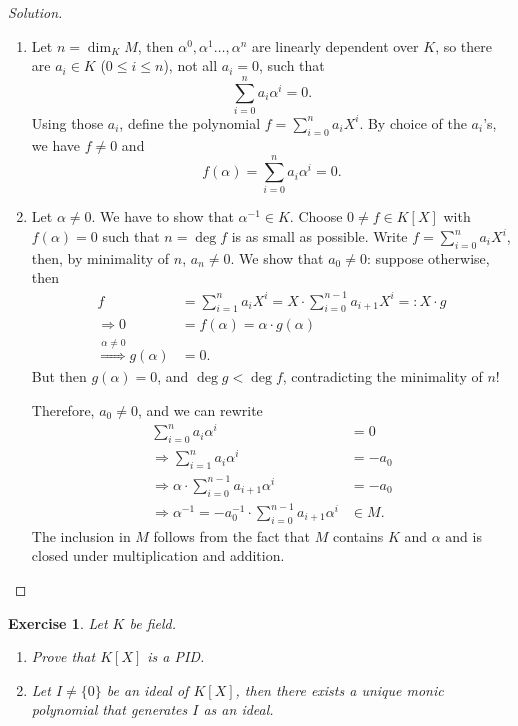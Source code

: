 \documentclass[a4paper,10pt,reqno]{amsart}
\newtheorem{ex}{Exercise}[section]
\newenvironment{sol}
  {\renewcommand\qedsymbol{$\blacksquare$}\begin{proof}[Solution]}
  {\end{proof}}
\begin{document}
\begin{sol}
    \begin{enumerate}[label=(\roman*)]
        \item Let $n = \dim_KM$, then $\alpha^0,\alpha^1 \ldots, \alpha^n$ are linearly dependent over $K$, so there are $a_i \in K$ ($0 \leq i \leq n$), not all $a_i = 0$, such that
        \[
        \sum_{i=0}^n a_i \alpha^i = 0.
        \]
        Using those $a_i$, define the polynomial $f = \sum_{i=0}^n a_iX^i$. By choice of the $a_i$'s, we have $f \neq 0$ and
        \[
        f(\alpha) = \sum_{i=0}^n a_i \alpha^i = 0.
        \]
        \item Let $\alpha \neq 0$. We have to show that $\alpha^{-1} \in K$. Choose $0 \neq f \in K[X]$ with $f(\alpha) = 0$ such that $n= \deg f$ is as small as possible. Write $f = \sum_{i=0}^na_iX^i$, then, by minimality of $n$, $a_n \neq 0$. We show that $a_0 \neq 0$: suppose otherwise, then
        \begin{align*}
            f & = \sum_{i=1}^na_iX^i  
             = X \cdot \sum_{i=0}^{n-1}a_{i+1}X^i
             =: X \cdot g \\
            \Rightarrow 0 & = f(\alpha) = \alpha \cdot g(\alpha)\\
            \overset{\alpha \neq 0}{\Rightarrow} g(\alpha) & = 0.
        \end{align*}
        But then $g(\alpha) = 0$, and $\deg g < \deg f$, contradicting the minimality of $n$!

        Therefore, $a_0 \neq 0$, and we can rewrite
        \begin{align*}
            \sum_{i=0}^n a_i \alpha^i & = 0 \\
           \Rightarrow \sum_{i=1}^n a_i \alpha^i & = -a_0 \\
           \Rightarrow \alpha \cdot  \sum_{i=0}^{n-1} a_{i+1} \alpha^i & = -a_0 \\
           \Rightarrow \alpha^{-1} = -a_0^{-1} \cdot \sum_{i=0}^{n-1} a_{i+1} \alpha^i & \in M.
        \end{align*}
        The inclusion in $M$ follows from the fact that $M$ contains $K$ and $\alpha$ and is closed under multiplication and addition.
    \end{enumerate}
\end{sol}

\begin{ex}
\label{1.7}
Let $K$ be field.
\begin{enumerate}[label=(\roman*)]
    \item Prove that $K[X]$ is a PID.
    \item Let $I\neq \{0\}$ be an ideal of $K[X]$, then there exists a unique monic polynomial that generates $I$ as an ideal.
\end{enumerate}
    
\end{ex}
\newpage
\end{document}
